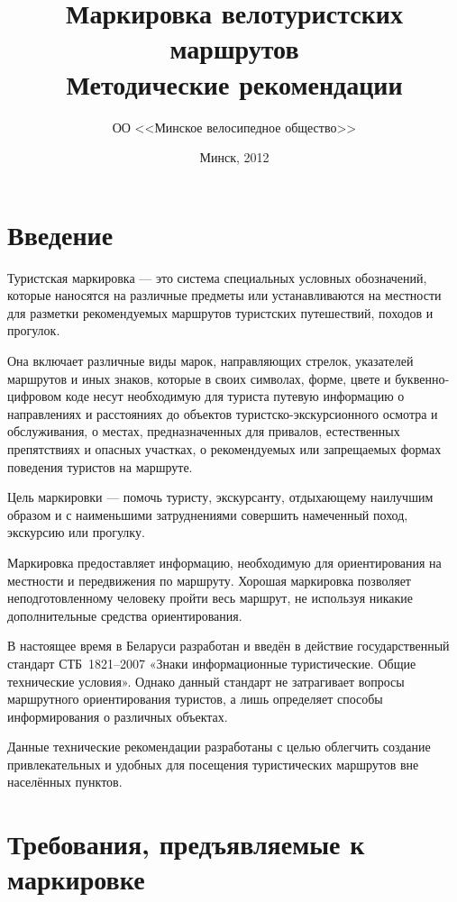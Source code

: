 \documentclass[a5paper,10pt,titlepage]{extarticle}
\author{ОО <<Минское велосипедное общество>>}
\date{Минск, 2012}
\title{Маркировка велотуристских маршрутов\\ Методические рекомендации}
\begin{document}
\maketitle

\section{Введение}

Туристская маркировка --- это система специальных условных обозначений, которые наносятся на различные предметы или устанавливаются на местности для разметки рекомендуемых маршрутов туристских путешествий, походов и прогулок.

Она включает различные виды марок, направляющих стрелок, указателей маршрутов и иных знаков, которые в своих символах,
форме, цвете и буквенно-цифровом коде несут необходимую для туриста путевую информацию о направлениях и расстояниях до
объектов туристско-экскурсионного осмотра и обслуживания, о местах, предназначенных для привалов, естественных
препятствиях и опасных участках, о рекомендуемых или запрещаемых формах поведения туристов на маршруте.

Цель маркировки --- помочь туристу, экскурсанту, отдыхающему наилучшим образом и с наименьшими затруднениями совершить
намеченный поход, экскурсию или прогулку.

Маркировка предоставляет информацию, необходимую для ориентирования на местности и передвижения по маршруту. Хорошая
маркировка позволяет неподготовленному человеку пройти весь маршрут, не используя никакие дополнительные средства
ориентирования.

В настоящее время в Беларуси разработан и введён в действие государственный стандарт СТБ~1821--2007 «Знаки
информационные туристические. Общие технические условия». Однако данный стандарт не затрагивает вопросы маршрутного
ориентирования туристов, а лишь определяет способы информирования о различных объектах.

Данные технические рекомендации разработаны с целью облегчить создание привлекательных и удобных для посещения
туристических маршрутов вне населённых пунктов.

\section{Требования, предъявляемые к маркировке}
\end{document}
